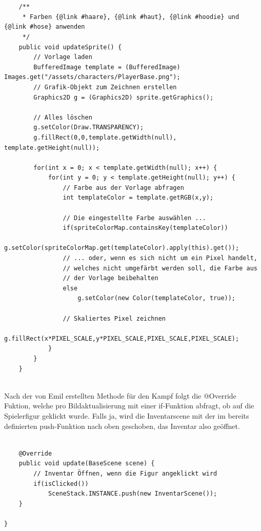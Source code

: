 \begin{lstlisting}
    
  
    /**
     * Farben {@link #haare}, {@link #haut}, {@link #hoodie} und {@link #hose} anwenden
     */
    public void updateSprite() {
        // Vorlage laden
        BufferedImage template = (BufferedImage) Images.get("/assets/characters/PlayerBase.png");
        // Grafik-Objekt zum Zeichnen erstellen
        Graphics2D g = (Graphics2D) sprite.getGraphics();

        // Alles löschen
        g.setColor(Draw.TRANSPARENCY);
        g.fillRect(0,0,template.getWidth(null), template.getHeight(null));

        for(int x = 0; x < template.getWidth(null); x++) {
            for(int y = 0; y < template.getHeight(null); y++) {
                // Farbe aus der Vorlage abfragen
                int templateColor = template.getRGB(x,y);

                // Die eingestellte Farbe auswählen ...
                if(spriteColorMap.containsKey(templateColor))
                    g.setColor(spriteColorMap.get(templateColor).apply(this).get());
                // ... oder, wenn es sich nicht um ein Pixel handelt,
                // welches nicht umgefärbt werden soll, die Farbe aus
                // der Vorlage beibehalten
                else
                    g.setColor(new Color(templateColor, true));

                // Skaliertes Pixel zeichnen
                g.fillRect(x*PIXEL_SCALE,y*PIXEL_SCALE,PIXEL_SCALE,PIXEL_SCALE);
            }
        }
    }


\end{lstlisting}

Nach der von Emil erstellten Methode für den Kampf folgt die @Override Fuktion, welche pro Bildaktualisierung mit einer if-Funktion abfragt, ob auf die Spielerfigur geklickt wurde. Falls ja, wird die Inventarscene mit der im bereits definierten push-Funktion nach oben geschoben, das Inventar also geöffnet.
\\
\begin{lstlisting}
    
    @Override
    public void update(BaseScene scene) {
        // Inventar Öffnen, wenn die Figur angeklickt wird
        if(isClicked())
            SceneStack.INSTANCE.push(new InventarScene());
    }
    
}

\end{lstlisting}

